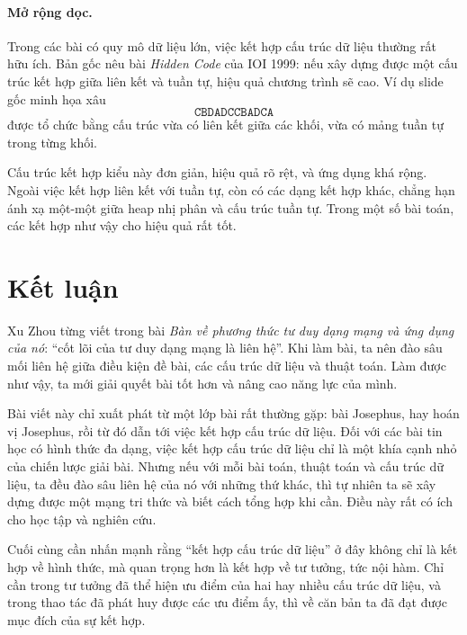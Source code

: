 \documentclass[11pt]{article}
\begin{document}
\paragraph{Mở rộng dọc.}
Trong các bài có quy mô dữ liệu lớn, việc kết hợp cấu trúc dữ liệu thường rất
hữu ích. Bản gốc nêu bài \textit{Hidden Code} của IOI 1999: nếu xây dựng được
một cấu trúc kết hợp giữa liên kết và tuần tự, hiệu quả chương trình sẽ cao.
Ví dụ slide gốc minh họa xâu
\[
  \texttt{CBDADCCBADCA}
\]
được tổ chức bằng cấu trúc vừa có liên kết giữa các khối, vừa có mảng tuần tự
trong từng khối.

Cấu trúc kết hợp kiểu này đơn giản, hiệu quả rõ rệt, và ứng dụng khá rộng.
Ngoài việc kết hợp liên kết với tuần tự, còn có các dạng kết hợp khác, chẳng
hạn ánh xạ một-một giữa heap nhị phân và cấu trúc tuần tự. Trong một số bài
toán, các kết hợp như vậy cho hiệu quả rất tốt.

\section{Kết luận}

Xu Zhou từng viết trong bài \textit{Bàn về phương thức tư duy dạng mạng và ứng
dụng của nó}: ``cốt lõi của tư duy dạng mạng là liên hệ''. Khi làm bài, ta nên
đào sâu mối liên hệ giữa điều kiện đề bài, các cấu trúc dữ liệu và thuật toán.
Làm được như vậy, ta mới giải quyết bài tốt hơn và nâng cao năng lực của mình.

Bài viết này chỉ xuất phát từ một lớp bài rất thường gặp: bài Josephus, hay
hoán vị Josephus, rồi từ đó dẫn tới việc kết hợp cấu trúc dữ liệu. Đối với các
bài tin học có hình thức đa dạng, việc kết hợp cấu trúc dữ liệu chỉ là một
khía cạnh nhỏ của chiến lược giải bài. Nhưng nếu với mỗi bài toán, thuật toán
và cấu trúc dữ liệu, ta đều đào sâu liên hệ của nó với những thứ khác, thì tự
nhiên ta sẽ xây dựng được một mạng tri thức và biết cách tổng hợp khi cần.
Điều này rất có ích cho học tập và nghiên cứu.

Cuối cùng cần nhấn mạnh rằng ``kết hợp cấu trúc dữ liệu'' ở đây không chỉ là
kết hợp về hình thức, mà quan trọng hơn là kết hợp về tư tưởng, tức nội hàm.
Chỉ cần trong tư tưởng đã thể hiện ưu điểm của hai hay nhiều cấu trúc dữ liệu,
và trong thao tác đã phát huy được các ưu điểm ấy, thì về căn bản ta đã đạt
được mục đích của sự kết hợp.
\end{document}
